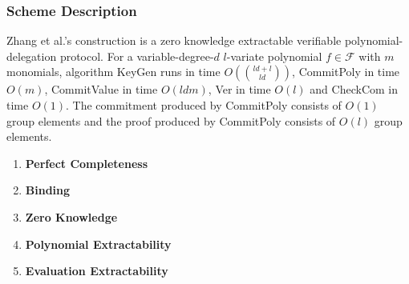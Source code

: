 \subsubsection{Scheme Description}

\begin{theorem} Zhang et al.'s construction \cite{zkvpd} is a zero knowledge extractable verifiable polynomial-delegation protocol. For a variable-degree-$d$ $l$-variate polynomial $f \in \mathcal{F}$ with $m$ monomials, algorithm \textnormal{KeyGen} runs in time $O(\binom{ld+l}{ld})$, \textnormal{CommitPoly} in time $O(m)$, \textnormal{CommitValue} in time $O(ldm)$, \textnormal{Ver} in time $O(l)$ and \textnormal{CheckCom} in time $O(1)$. The commitment produced by \textnormal{CommitPoly} consists of $O(1)$ group elements and the proof produced by \textnormal{CommitPoly} consists of $O(l)$ group elements.
\end{theorem}

\begin{definition}
	\label{def::zkvpd}
	\begin{enumerate}
		\item \textbf{Perfect Completeness}
		\item \textbf{Binding}
		\item \textbf{Zero Knowledge}
		\item \textbf{Polynomial Extractability}
		\item \textbf{Evaluation Extractability}
	\end{enumerate}
\end{definition}
